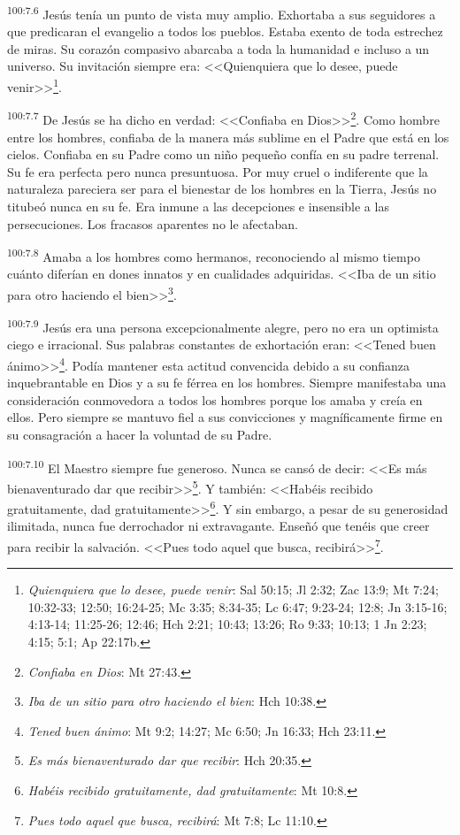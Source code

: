 \documentclass[twoside, 11pt]{book}
\begin{document}
\par
\textsuperscript{100:7.6} Jesús tenía un punto de vista muy amplio. Exhortaba a sus seguidores a que predicaran el evangelio a todos los pueblos. Estaba exento de toda estrechez de miras. Su corazón compasivo abarcaba a toda la humanidad e incluso a un universo. Su invitación siempre era: <<Quienquiera que lo desee, puede venir>>\footnote{\textit{Quienquiera que lo desee, puede venir}: Sal 50:15; Jl 2:32; Zac 13:9; Mt 7:24; 10:32-33; 12:50; 16:24-25; Mc 3:35; 8:34-35; Lc 6:47; 9:23-24; 12:8; Jn 3:15-16; 4:13-14; 11:25-26; 12:46; Hch 2:21; 10:43; 13:26; Ro 9:33; 10:13; 1 Jn 2:23; 4:15;  5:1; Ap 22:17b.}.

\par
\textsuperscript{100:7.7} De Jesús se ha dicho en verdad: <<Confiaba en Dios>>\footnote{\textit{Confiaba en Dios}: Mt 27:43.}. Como hombre entre los hombres, confiaba de la manera más sublime en el Padre que está en los cielos. Confiaba en su Padre como un niño pequeño confía en su padre terrenal. Su fe era perfecta pero nunca presuntuosa. Por muy cruel o indiferente que la naturaleza pareciera ser para el bienestar de los hombres en la Tierra, Jesús no titubeó nunca en su fe. Era inmune a las decepciones e insensible a las persecuciones. Los fracasos aparentes no le afectaban.

\par
\textsuperscript{100:7.8} Amaba a los hombres como hermanos, reconociendo al mismo tiempo cuánto diferían en dones innatos y en cualidades adquiridas. <<Iba de un sitio para otro haciendo el bien>>\footnote{\textit{Iba de un sitio para otro haciendo el bien}: Hch 10:38.}.

\par
\textsuperscript{100:7.9} Jesús era una persona excepcionalmente alegre, pero no era un optimista ciego e irracional. Sus palabras constantes de exhortación eran: <<Tened buen ánimo>>\footnote{\textit{Tened buen ánimo}: Mt 9:2; 14:27; Mc 6:50; Jn 16:33; Hch 23:11.}. Podía mantener esta actitud convencida debido a su confianza inquebrantable en Dios y a su fe férrea en los hombres. Siempre manifestaba una consideración conmovedora a todos los hombres porque los amaba y creía en ellos. Pero siempre se mantuvo fiel a sus convicciones y magníficamente firme en su consagración a hacer la voluntad de su Padre.

\par
\textsuperscript{100:7.10} El Maestro siempre fue generoso. Nunca se cansó de decir: <<Es más bienaventurado dar que recibir>>\footnote{\textit{Es más bienaventurado dar que recibir}: Hch 20:35.}. Y también: <<Habéis recibido gratuitamente, dad gratuitamente>>\footnote{\textit{Habéis recibido gratuitamente, dad gratuitamente}: Mt 10:8.}. Y sin embargo, a pesar de su generosidad ilimitada, nunca fue derrochador ni extravagante. Enseñó que tenéis que creer para recibir la salvación. <<Pues todo aquel que busca, recibirá>>\footnote{\textit{Pues todo aquel que busca, recibirá}: Mt 7:8; Lc 11:10.}.
\end{document}
